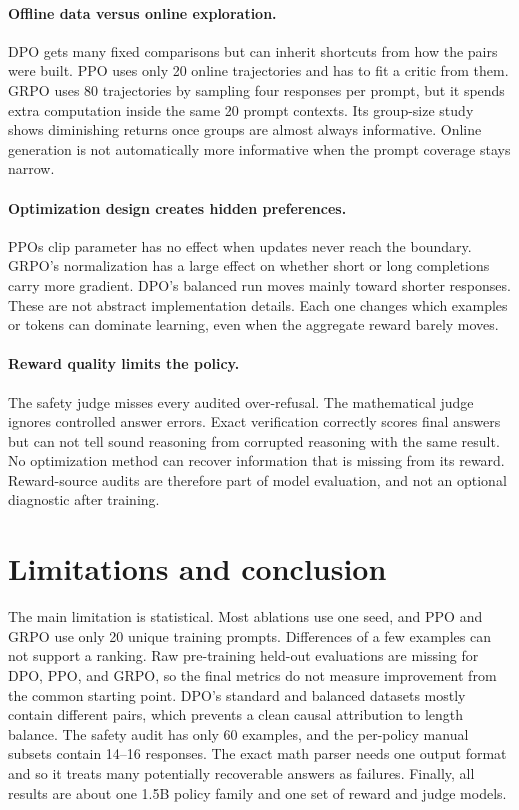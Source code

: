\documentclass{article}
\begin{document}
\paragraph{Offline data versus online exploration.}
DPO gets many fixed comparisons but can inherit shortcuts from how the pairs were built. PPO uses only 20 online trajectories and has to fit a critic from them. GRPO uses 80 trajectories by sampling four responses per prompt, but it spends extra computation inside the same 20 prompt contexts. Its group-size study shows diminishing returns once groups are almost always informative. Online generation is not automatically more informative when the prompt coverage stays narrow.

\paragraph{Optimization design creates hidden preferences.}
PPOs clip parameter has no effect when updates never reach the boundary. GRPO's normalization has a large effect on whether short or long completions carry more gradient. DPO's balanced run moves mainly toward shorter responses. These are not abstract implementation details. Each one changes which examples or tokens can dominate learning, even when the aggregate reward barely moves.

\paragraph{Reward quality limits the policy.}
The safety judge misses every audited over-refusal. The mathematical judge ignores controlled answer errors. Exact verification correctly scores final answers but can not tell sound reasoning from corrupted reasoning with the same result. No optimization method can recover information that is missing from its reward. Reward-source audits are therefore part of model evaluation, and not an optional diagnostic after training.

\section{Limitations and conclusion}
The main limitation is statistical. Most ablations use one seed, and PPO and GRPO use only 20 unique training prompts. Differences of a few examples can not support a ranking. Raw pre-training held-out evaluations are missing for DPO, PPO, and GRPO, so the final metrics do not measure improvement from the common starting point. DPO's standard and balanced datasets mostly contain different pairs, which prevents a clean causal attribution to length balance. The safety audit has only 60 examples, and the per-policy manual subsets contain 14--16 responses. The exact math parser needs one output format and so it treats many potentially recoverable answers as failures. Finally, all results are about one 1.5B policy family and one set of reward and judge models.
\end{document}
